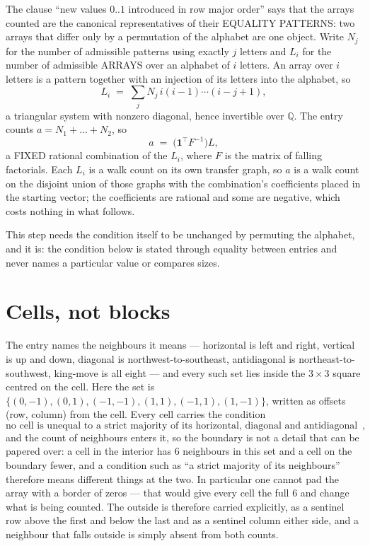\documentclass[11pt,a4paper]{article}
\theoremstyle{plain}
\theoremstyle{definition}
\begin{document}
The clause ``new values $0..1$ introduced in row major order'' says that the arrays
counted are the canonical representatives of their EQUALITY PATTERNS: two arrays that differ
only by a permutation of the alphabet are one object. Write $N_j$ for the number of admissible
patterns using exactly $j$ letters and $L_i$ for the number of admissible ARRAYS over an
alphabet of $i$ letters. An array over $i$ letters is a pattern together with an injection of
its letters into the alphabet, so
\[
L_i\;=\;\sum_{j}N_j\,i(i-1)\cdots(i-j+1),
\]
a triangular system with nonzero diagonal, hence invertible over $\mathbb{Q}$. The entry
counts $a=N_1+\dots+N_{2}$, so
\[
a\;=\;\bigl(\mathbf{1}^{\!\top}F^{-1}\bigr)L ,
\]
a FIXED rational combination of the $L_i$, where $F$ is the matrix of falling factorials.
Each $L_i$ is a walk count on its own transfer graph, so $a$ is a walk count on the disjoint
union of those graphs with the combination's coefficients placed in the starting vector; the
coefficients are rational and some are negative, which costs nothing in what follows.

This step needs the condition itself to be unchanged by permuting the alphabet, and it is:
the condition below is stated through equality between entries and never names a particular
value or compares sizes.

\section{Cells, not blocks}

The entry names the neighbours it means --- horizontal is left and right, vertical is up and
down, diagonal is northwest-to-southeast, antidiagonal is northeast-to-southwest, king-move is
all eight --- and every such set lies inside the $3\times3$ square centred on the cell. Here
the set is $\{(0,-1), (0,1), (-1,-1), (1,1), (-1,1), (1,-1)\}$, written as offsets (row, column) from the cell. Every cell carries
the condition
\[
\text{no cell is unequal to a strict majority of its horizontal, diagonal and antidiagonal neighbours},
\]
and the count of neighbours enters it, so the boundary is not a detail that can be papered
over: a cell in the interior has $6$ neighbours in this set and a cell on the boundary
fewer, and a condition such as ``a strict majority of its neighbours'' therefore means
different things at the two. In particular one cannot pad the array with a border of zeros ---
that would give every cell the full $6$ and change what is being counted. The outside is
therefore carried
explicitly, as a sentinel row above the first and below the last and as a sentinel column
either side, and a neighbour that falls outside is simply absent from both counts.
\end{document}
